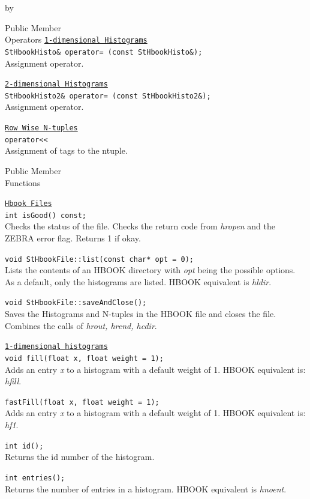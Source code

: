\documentclass[twoside]{article}
\newcommand{\comp}[1]{\texttt{#1}}%
\newcommand{\entrylabel}[1]{\mbox{\textbf{{#1}}}\hfil}%
\newenvironment{entry}
{\begin{list}{}%
    {\renewcommand{\makelabel}{\entrylabel}%
     \setlength{\labelwidth}{90pt}%
     \setlength{\leftmargin}{\labelwidth}
     \advance\leftmargin by \labelsep%
      }%
    }%
  {\end{list}}
\newcommand{\Entrylabel}[1]%
{\raisebox{0pt}[1ex][0pt]{\makebox[\labelwidth][l]%
    {\parbox[t]{\labelwidth}{\hspace{0pt}\textbf{{#1}}}}}}
\newenvironment{Entry}%
{\renewcommand{\entrylabel}{\Entrylabel}\begin{entry}}%
  {\end{entry}}
\begin{document}
\begin{Entry}
\item[Public Member\\ Operators]
  \comp{\underline{1-dimensional Histograms}} \\
  \verb+StHbookHisto& operator= (const StHbookHisto&);+\\
  Assignment operator.

  \comp{\underline{2-dimensional Histograms}} \\
  \verb+StHbookHisto2& operator= (const StHbookHisto2&);+\\
  Assignment operator.

  \comp{\underline{Row Wise N-tuples}} \\
  \verb+operator<<+\\
  Assignment of tags to the ntuple.
  
\item[Public Member\\ Functions]

  \comp{\underline{Hbook Files}} \\
  \verb+int isGood() const;+\\
  Checks the status of the file.  Checks the return
  code from {\em hropen} and the ZEBRA error flag.
  Returns 1 if okay.
  
  \verb+void StHbookFile::list(const char* opt = 0);+\\
  Lists the contents of an HBOOK directory with {\em opt}
  being the possible options.  As a default, only the histograms
  are listed.  HBOOK equivalent is {\em hldir}.
  
  \verb+void StHbookFile::saveAndClose();+\\
  Saves the Histograms and N-tuples in the HBOOK file
  and closes the file.  Combines the calls of
  {\em hrout,   hrend,  hcdir}.
  
  \comp{\underline{1-dimensional histograms}}\\
  \verb+void fill(float x, float weight = 1);+\\
  Adds an entry {\em x} to a histogram with a default weight of 1.
  HBOOK equivalent is: {\em hfill}.
  
  \verb+fastFill(float x, float weight = 1);+\\
  Adds an entry {\em x} to a histogram with a default weight of 1.
  HBOOK equivalent is: {\em hf1}.

  \verb+int id();+\\
  Returns the id number of the histogram. 

  \verb+int entries();+\\
  Returns the number of entries in a histogram.  HBOOK equivalent
  is {\em  hnoent}.
  

\end{Entry}
\end{document}
